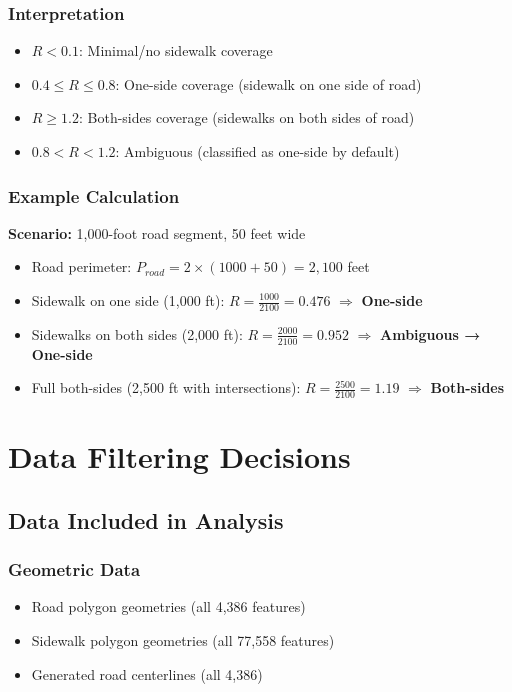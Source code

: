 \documentclass[11pt,letterpaper]{article}
\begin{document}
\subsubsection{Interpretation}

\begin{itemize}
    \item $R < 0.1$: Minimal/no sidewalk coverage
    \item $0.4 \leq R \leq 0.8$: One-side coverage (sidewalk on one side of road)
    \item $R \geq 1.2$: Both-sides coverage (sidewalks on both sides of road)
    \item $0.8 < R < 1.2$: Ambiguous (classified as one-side by default)
\end{itemize}

\subsubsection{Example Calculation}

\textbf{Scenario:} 1,000-foot road segment, 50 feet wide

\begin{itemize}
    \item Road perimeter: $P_{road} = 2 \times (1000 + 50) = 2,100$ feet
    \item Sidewalk on one side (1,000 ft): $R = \frac{1000}{2100} = 0.476$ $\Rightarrow$ \textbf{One-side}
    \item Sidewalks on both sides (2,000 ft): $R = \frac{2000}{2100} = 0.952$ $\Rightarrow$ \textbf{Ambiguous → One-side}
    \item Full both-sides (2,500 ft with intersections): $R = \frac{2500}{2100} = 1.19$ $\Rightarrow$ \textbf{Both-sides}
\end{itemize}

\section{Data Filtering Decisions}

\subsection{Data Included in Analysis}

\subsubsection{Geometric Data}
\begin{itemize}
    \item Road polygon geometries (all 4,386 features)
    \item Sidewalk polygon geometries (all 77,558 features)
    \item Generated road centerlines (all 4,386)
\end{itemize}
\end{document}
